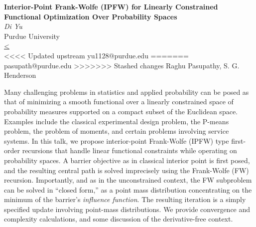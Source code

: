 \documentclass[12pt,a4paper,figuresright]{book}
\newenvironment{talk}[6]%
 {%
  \vskip 0pt\nopagebreak%
 \vskip 0pt\nopagebreak%
  \textbf{#1}\vspace{3mm}\\\nopagebreak%
  \textit{#2}\\\nopagebreak%
  #3\\\nopagebreak%
  \url{#4}\vspace{3mm}\\\nopagebreak%
  \ifthenelse{\equal{#5}{}}{}{Coauthor(s): #5\vspace{3mm}\\\nopagebreak}%
  \ifthenelse{\equal{#6}{}}{}{Special session: #6\quad \vspace{3mm}\\\nopagebreak}%
 }
 {\vspace{1cm}\nopagebreak}%
\begin{document}
	
\begin{talk}
  {Interior-Point Frank-Wolfe (IPFW) for Linearly Constrained Functional Optimization Over Probability Spaces}%
  {Di Yu}%
  {Purdue University}%
<<<<<<< Updated upstream
  {yu1128@purdue.edu}%
=======
  {pasupath@purdue.edu}%
>>>>>>> Stashed changes
  {Raghu Pasupathy, S. G. Henderson}%
  {}%
			
Many challenging problems in statistics and applied probability can be posed as that of minimizing a smooth functional over a linearly constrained space of probability measures supported on a compact subset of the Euclidean space. Examples include the classical experimental design problem, the P-means problem, the problem of moments, and certain problems involving service systems.  In this talk, we propose interior-point Frank-Wolfe (IPFW) type first-order recursions that handle linear functional constraints while operating on probability spaces. A barrier objective as in classical interior point is first posed, and the resulting central path is solved imprecisely using the Frank-Wolfe (FW) recursion. Importantly, and as in the unconstrained context, the FW subproblem can be solved in ``closed form,'' as a point mass distribution concentrating on the minimum of the barrier's \emph{influence function}. The resulting iteration is a simply specified update involving point-mass distributions. We provide convergence and complexity calculations, and some discussion of the derivative-free context. 

\medskip




\end{talk}
\end{document}
